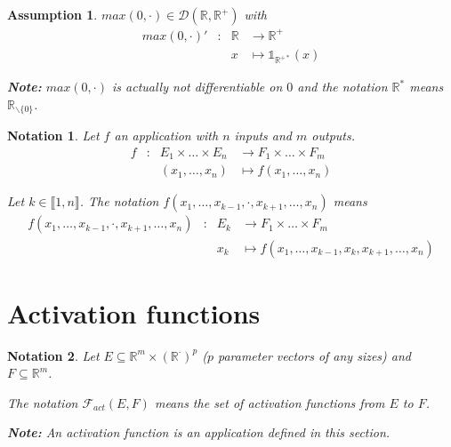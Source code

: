 \documentclass[11pt,en]{elegantpaper}
\newtheorem{notation}{Notation}
\newtheorem{assumption}{Assumption}
\newcommand{\Real}{\mathbb{R}}
\begin{document}
\begin{assumption}\label{assump:max_differentiable}
  $max(0,\cdot) \in \mathcal{D}(\Real, \Real^+)$ with
  \begin{equation*}
    \begin{array}{lllll}
      max(0,\cdot)' & : & \Real & \longrightarrow \Real^+ \\
      &   & x & \longmapsto \mathbb{1}_{\Real^{+*}}(x)
    \end{array}
  \end{equation*}\par

  \textbf{Note:} $max(0,\cdot)$ is actually not \textit{differentiable} on $0$ and the notation $\Real^{*}$ means $\Real_{\backslash\{0\}}$. \par
\end{assumption}

\begin{notation}
  Let $f$ an application with $n$ inputs and $m$ outputs.
  \begin{equation*}
    \begin{array}{llll}
      f & : & E_1 \times \ldots \times E_n & \longrightarrow F_1 \times \ldots \times F_m \\
      &   & (x_1, \ldots, x_n) & \longmapsto f(x_1, \ldots, x_n)
    \end{array}
  \end{equation*} \par

  Let $k \in \llbracket 1,n \rrbracket$. The notation $f(x_1, \ldots, x_{k-1}, \cdot, x_{k+1}, \ldots, x_n)$ means \begin{equation*}
    \begin{array}{llll}
      f(x_1, \ldots, x_{k-1}, \cdot, x_{k+1}, \ldots, x_n) & : & E_k & \longrightarrow F_1 \times \ldots \times F_m \\
      &   & x_k & \longmapsto f(x_1, \ldots, x_{k-1}, x_k, x_{k+1}, \ldots, x_n)
    \end{array}
  \end{equation*}
\end{notation}

\section{Activation functions}

\begin{notation}
  Let $E \subseteq \Real^m \times (\Real^{\cdot})^p$ ($p$ parameter vectors of any sizes) and $F \subseteq \Real^m$. \par
  The notation $\mathcal{F}_{act}(E,F)$ means the set of activation functions from $E$ to $F$. \par
  \textbf{Note:} An activation function is an application defined in this section. \par
\end{notation}
\end{document}
